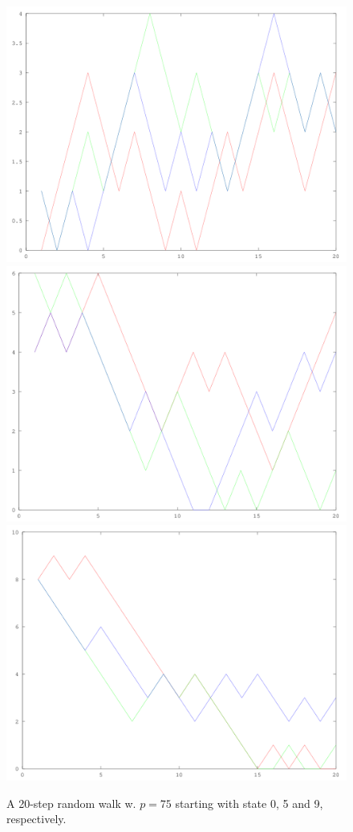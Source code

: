 \begin{figure}[!htbp]
  \includegraphics[width=\textwidth/2]{randwalk0_75.png}
  \includegraphics[width=\textwidth/2]{randwalk5_75.png}
  \includegraphics[width=\textwidth/1]{randwalk9_75.png}
  \caption{A 20-step random walk w. $p=75$ starting with state 0, 5 and 9, respectively.}
  \label{randwalk2}
\end{figure}

